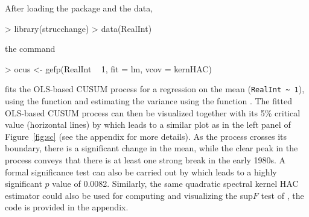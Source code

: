 \documentclass{Z}
\begin{document}
After loading the package and the data,
\begin{Schunk}
\begin{Sinput}
> library(strucchange)
> data(RealInt)
\end{Sinput}
\end{Schunk}
the command
\begin{Schunk}
\begin{Sinput}
> ocus <- gefp(RealInt ~ 1, fit = lm, vcov = kernHAC)
\end{Sinput}
\end{Schunk}
fits the OLS-based CUSUM process for a regression on the mean (\verb/RealInt ~ 1/),
using the function  and estimating the variance using the function
. The fitted OLS-based CUSUM process can then be visualized together
with its 5\% critical value (horizontal lines) by  which leads to
a similar plot as in the left panel of Figure~\ref{fig:sc} (see the appendix for more details).
As the process crosses its boundary, there is a significant change in the mean, while
the clear peak in the process conveys that there is at least one strong break in the
early 1980s. A formal significance test can also be carried out by 
which leads to a highly significant $p$ value of 0.0082.
Similarly, the same quadratic spectral kernel HAC estimator could also be used for
computing and visualizing the sup$F$ test of \cite{hac:Andrews:1993}, the code is provided 
in the appendix.
\end{document}
